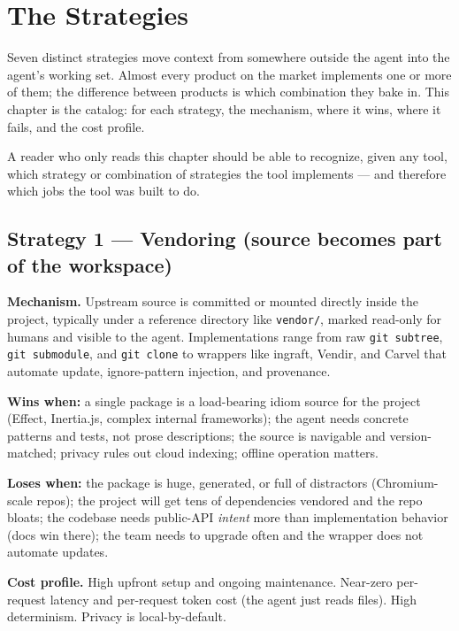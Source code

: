 \documentclass[
  11pt,
  letterpaper,
  numbers=noendperiod,
  parskip=half]{scrartcl}
\begin{document}
\fi

\section{The Strategies}\label{sec-strategies}

Seven distinct strategies move context from somewhere outside the agent
into the agent's working set. Almost every product on the market
implements one or more of them; the difference between products is which
combination they bake in. This chapter is the catalog: for each
strategy, the mechanism, where it wins, where it fails, and the cost
profile.

A reader who only reads this chapter should be able to recognize, given
any tool, which strategy or combination of strategies the tool
implements --- and therefore which jobs the tool was built to do.

\subsection{Strategy 1 --- Vendoring (source becomes part of the
workspace)}\label{sec-strat-vendor}

\textbf{Mechanism.} Upstream source is committed or mounted directly
inside the project, typically under a reference directory like
\texttt{vendor/}, marked read-only for humans and visible to the agent.
Implementations range from raw \texttt{git subtree}, \texttt{git
submodule}, and \texttt{git clone} to wrappers like ingraft, Vendir,
and Carvel that automate update, ignore-pattern injection, and
provenance.

\textbf{Wins when:} a single package is a load-bearing idiom source for
the project (Effect, Inertia.js, complex internal frameworks); the
agent needs concrete patterns and tests, not prose descriptions; the
source is navigable and version-matched; privacy rules out cloud
indexing; offline operation matters.

\textbf{Loses when:} the package is huge, generated, or full of distractors
(Chromium-scale repos); the project will get tens of dependencies vendored
and the repo bloats; the codebase needs public-API \emph{intent} more than
implementation behavior (docs win there); the team needs to upgrade often
and the wrapper does not automate updates.

\textbf{Cost profile.} High upfront setup and ongoing maintenance.
Near-zero per-request latency and per-request token cost (the agent
just reads files). High determinism. Privacy is local-by-default.
\end{document}
